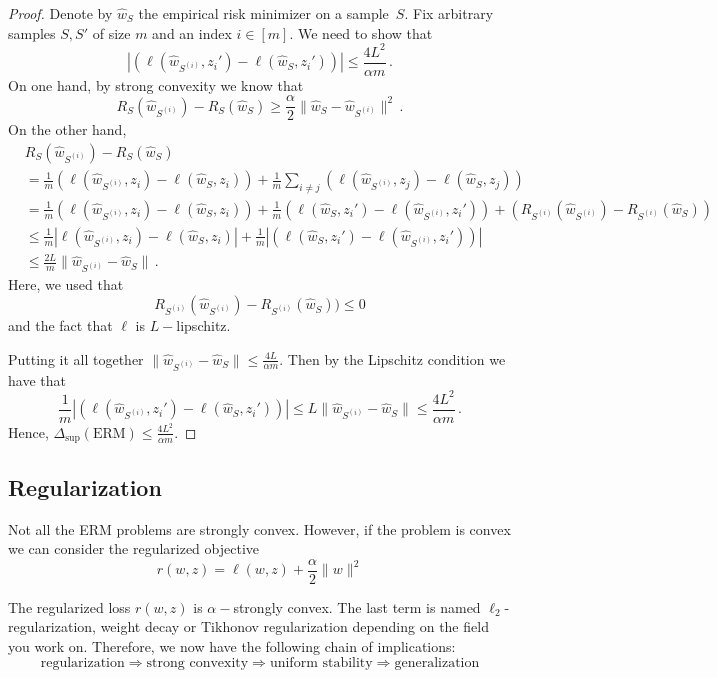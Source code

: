 \begin{proof}
Denote by $\hat w_S$ the empirical risk minimizer on a sample~$S.$
Fix arbitrary samples $S,S'$ of size $m$ and an index $i\in[m].$
We need to show that 
\[
|( \ell(\hat w_{S^{(i)}}, z_i') - \ell(\hat w_{S}, z_i')) |  \leq \frac{4
L^2}{\alpha m}\,.
\]
On one hand, by strong convexity we know that
\[
R_S(\hat w_{S^{(i)}}) - R_S(\hat w_{S}) \geq \frac{\alpha}{2} \| \hat w_{S} -
\hat w_{S^{(i)}} \|^2 \,.
\]
On the other hand, 
\begin{align*}
& R_S(\hat w_{S^{(i)}}) - R_S(\hat w_{S})\\
&=  \frac{1}{m} ( \ell(\hat w_{S^{(i)}}, z_i) - \ell(\hat w_{S}, z_i)) + \frac{1}{m} \sum_{i \neq j} ( \ell(\hat w_{S^{(i)}}, z_j) - \ell(\hat w_{S}, z_j))\\
&=\frac{1}{m} (\ell(\hat w_{S^{(i)}}, z_i) - \ell(\hat w_{S}, z_i)) 
+ \frac{1}{m} (\ell(\hat w_{S}, z_i') - \ell(\hat w_{S^{(i)}}, z_i')) 
+ \left(R_{S^{(i)}}(\hat w_{S^{(i)}}) - R_{S^{(i)}}(\hat w_{S})\right)\\ 
&\leq \frac{1}{m} | \ell(\hat w_{S^{(i)}}, z_i) - \ell(\hat w_{S}, z_i)| +
\frac{1}{m} | ( \ell(\hat w_{S}, z_i') - \ell(\hat w_{S^{(i)}}, z_i')) | \\
&\leq  \frac{2 L}{m} \| \hat w_{S^{(i)}} - \hat w_{S}\|\,.
\end{align*}
Here, we used that 
\[
R_{S^{(i)}}(\hat w_{S^{(i)}}) - R_{S^{(i)}}(\hat w_{S})) \leq 0
\]
and the fact that $\ell$ is $L-$lipschitz.

Putting it all together $\| \hat w_{S^{(i)}} - \hat w_{S} \| \leq \frac{4 L}{\alpha m}$. Then by the Lipschitz condition we have that 
\[
\frac{1}{m} | ( \ell(\hat w_{S^{(i)}}, z_i') - \ell(\hat w_{S}, z_i')) | \leq L
\| \hat w_{S^{(i)}} - \hat w_{S} \| \leq \frac{4 L ^ 2}{\alpha m}\,.
\]
Hence, $\Delta_{\sup}(\text{ERM}) \leq \frac{4 L ^ 2}{\alpha m}$.

\end{proof}


\subsection{Regularization}

Not all the ERM problems are strongly convex. However, if the problem is convex we can consider the regularized objective
\begin{equation*}
r(w, z) = \ell(w, z) + \frac{\alpha}{2} \| w \|^2
\end{equation*}

The regularized loss $r(w, z)$ is $\alpha-$strongly convex. The last term is
named $\ell_2$-regularization, weight decay or Tikhonov regularization depending on
the field you work on. Therefore, we now have the following chain of
implications: 
$$
\text{regularization} \Rightarrow \text{strong convexity} \Rightarrow \text{uniform stability} \Rightarrow \text{generalization}
$$

